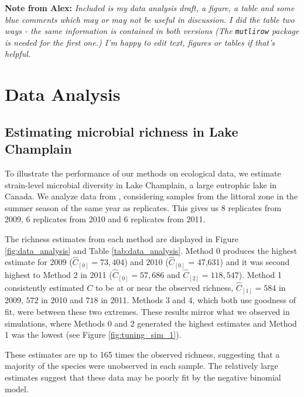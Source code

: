 \documentclass[12pt]{article}
\theoremstyle{break}
\theoremstyle{break}
\begin{document}
%

\def\spacingset#1{\renewcommand{\baselinestretch}%
{#1}\small\normalsize} \spacingset{1}




\noindent \textbf{Note from Alex:}\textit{ Included is my data analysis draft, a figure, a table and some blue comments which may or may not be useful in discussion.  I did the table two ways - the same information is contained in both versions (The \texttt{mutlirow} package is needed for the first one.)  I'm happy to edit text, figures or tables if that's helpful.}






\section{Data Analysis}
\label{sec:data_analysis}

\subsection{Estimating microbial richness in Lake Champlain}
\normalsize
To illustrate the performance of our methods on ecological data, we estimate strain-level microbial diversity in Lake Champlain, a large eutrophic lake in Canada.  We analyze data from \citet{tromas_2017}, considering samples from the littoral zone in the summer season of the same year as replicates. This gives us 8 replicates from 2009, 6 replicates from 2010 and 6 replicates from 2011.  

The richness estimates from each method are displayed in Figure \ref{fig:data_analysis} and Table \ref{tab:data_analysis}.  Method 0 produces the highest estimate for 2009 ($\widehat{C}_{[0]} = 73,404$) and 2010 ($\widehat{C}_{[0]}$ = 47,631) and it was second highest to Method 2 in 2011 ($\widehat{C}_{[0]} = 57,686$ and $\widehat{C}_{[2]} = 118,547$).  Method 1 consistently estimated $C$ to be at or near the observed richness, $\widehat{C}_{[1]} = 584$ in 2009,  $572$ in 2010 and $718$ in 2011.  Methods 3 and 4, which both use goodness of fit, were between these two extremes.  These results mirror what we observed in simulations, where Methods 0 and 2 generated the highest estimates and Method 1 was the lowest (see Figure \ref{fig:tuning_sim_1}).

These estimates are up to 165 times the observed richness, suggesting that a majority of the species were unobserved in each sample.  The relatively large estimates suggest that these data may be poorly fit by the negative binomial model.  \\
\end{document}
